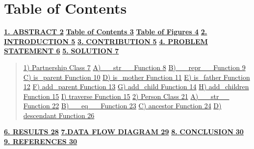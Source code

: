 \documentclass[
]{article}
\begin{document}
\section{Table of Contents}\label{table-of-contents} \hyperref[abstract]{\textbf{1. ABSTRACT 2}} \hyperref[table-of-contents]{\textbf{Table of Contents 3}} \hyperref[table-of-figures]{\textbf{Table of Figures 4}} \hyperref[introduction]{\textbf{2. INTRODUCTION 5}} \hyperref[contribution]{\textbf{3.} \textbf{CONTRIBUTION} \textbf{5}} \hyperref[problem-statement]{\textbf{4. PROBLEM STATEMENT 6}} \hyperref[solution]{\textbf{5.} \textbf{SOLUTION} \textbf{7}} \begin{quote}
\hyperref[partnership-class]{1) Partnership Class 7} \hyperref[str__-function]{A) \_\_str\_\_ Function 8} \hyperref[repr__-function]{B) \_\_repr\_\_ Function 9} \hyperref[is_parent-function]{C) is\_parent Function 10} \hyperref[is_mother-function]{D) is\_mother Function 11} \hyperref[is_father-function]{E) is\_father Function 12} \hyperref[add_parent-function]{F) add\_parent Function 13} \hyperref[add_child-function]{G) add\_child Function 14} \hyperref[add_children-function]{H) add\_children Function 15} \hyperref[traverse-function]{I) traverse Function 15} \hyperref[person-class]{2) Person Class 21} \hyperref[str__-function-1]{A) \_\_str\_\_ Function 22} \hyperref[eq__-function]{B) \_\_eq\_\_ Function 23} \hyperref[ancestor-function]{C) ancestor Function 24} \hyperref[descendant-function]{D) descendant Function 26}
\end{quote} \hyperref[results]{\textbf{6. RESULTS 28}} \hyperref[data-flow-diagram]{\textbf{7.DATA FLOW DIAGRAM 29}} \hyperref[conclusion]{\textbf{8.} \textbf{CONCLUSION} \textbf{30}} \hyperref[references]{\textbf{9. REFERENCES 30}} \newpage %
\end{document}
